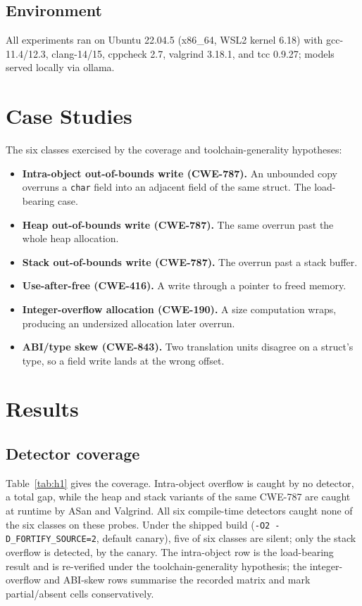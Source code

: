 \documentclass[11pt]{article}
\begin{document}
\subsection*{Environment}
All experiments ran on Ubuntu 22.04.5 (x86\_64, WSL2 kernel 6.18) with gcc-11.4/12.3,
clang-14/15, cppcheck 2.7, valgrind 3.18.1, and tcc 0.9.27; models served locally via ollama.

\section*{Case Studies}
The six classes exercised by the coverage and toolchain-generality hypotheses:

\begin{itemize}[leftmargin=1.4em]
  \item \textbf{Intra-object out-of-bounds write (CWE-787).} An unbounded copy overruns a
        \texttt{char} field into an adjacent field of the same struct. The load-bearing case.
  \item \textbf{Heap out-of-bounds write (CWE-787).} The same overrun past the whole
        heap allocation.
  \item \textbf{Stack out-of-bounds write (CWE-787).} The overrun past a stack buffer.
  \item \textbf{Use-after-free (CWE-416).} A write through a pointer to freed memory.
  \item \textbf{Integer-overflow allocation (CWE-190).} A size computation wraps, producing
        an undersized allocation later overrun.
  \item \textbf{ABI/type skew (CWE-843).} Two translation units disagree on a struct's type,
        so a field write lands at the wrong offset.
\end{itemize}

\section*{Results}

\subsection*{Detector coverage}
Table~\ref{tab:h1} gives the coverage. Intra-object overflow is caught by no detector, a
total gap, while the heap and stack variants of the same CWE-787 are caught at runtime by
ASan and Valgrind. All six compile-time detectors caught none of the six classes on these
probes. Under the shipped build (\texttt{-O2 -D\_FORTIFY\_SOURCE=2}, default canary), five of
six classes are silent; only the stack overflow is detected, by the canary. The intra-object
row is the load-bearing result and is re-verified under the toolchain-generality hypothesis;
the integer-overflow and ABI-skew
rows summarise the recorded matrix and mark partial/absent cells conservatively.
\end{document}
